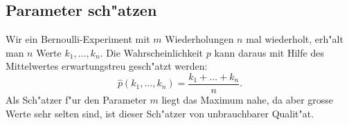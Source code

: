 \subsection{Parameter sch"atzen}
Wir ein Bernoulli-Experiment mit $m$ Wiederholungen $n$ mal wiederholt, erh"alt
man $n$ Werte $k_1,\dots,k_n$.
Die Wahrscheinlichkeit $p$ kann daraus mit Hilfe des Mittelwertes erwartungstreu
gesch"atzt werden:
\[
\hat p(k_1,\dots, k_n)=\frac{k_1+\dots+k_n}{n}.
\]
Als Sch"atzer f"ur den Parameter $m$ liegt das Maximum nahe, da aber
grosse Werte sehr selten sind, ist dieser Sch"atzer von unbrauchbarer
Qualit"at.

